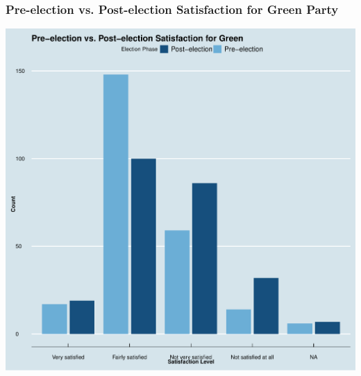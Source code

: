 \documentclass{beamer}
\begin{document}
\begin{frame}
    \frametitle{Pre-election vs. Post-election Satisfaction for Green Party}
    \begin{center}
        \includegraphics[scale=0.3]{Pre-election vs. Post-election Satisfaction for green.pdf}
    \end{center}
\end{frame}





\end{document}
